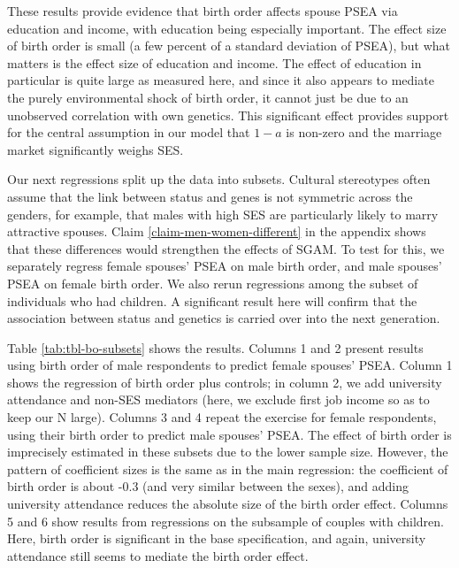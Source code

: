 \documentclass[
  12pt,
]{article}
\theoremstyle{definition}
\theoremstyle{definition}
\theoremstyle{definition}
\theoremstyle{definition}
\theoremstyle{remark}
\begin{document}
These results provide evidence that birth order affects spouse PSEA via
education and income, with education being especially important. The
effect size of birth order is small (a few percent of a standard
deviation of PSEA), but what matters is the effect size of education and
income. The effect of education in particular is quite large as measured
here, and since it also appears to mediate the purely environmental
shock of birth order, it cannot just be due to an unobserved correlation
with own genetics. This significant effect provides support for the
central assumption in our model that \(1 − a\) is non-zero and the
marriage market significantly weighs SES.

Our next regressions split up the data into subsets. Cultural
stereotypes often assume that the link between status and genes is not
symmetric across the genders, for example, that males with high SES are
particularly likely to marry attractive spouses. Claim
\ref{claim-men-women-different} in the appendix shows that these
differences would strengthen the effects of SGAM. To test for this, we
separately regress female spouses' PSEA on male birth order, and male
spouses' PSEA on female birth order. We also rerun regressions among the
subset of individuals who had children. A significant result here will
confirm that the association between status and genetics is carried over
into the next generation.

Table \ref{tab:tbl-bo-subsets} shows the results. Columns 1 and 2
present results using birth order of male respondents to predict female
spouses' PSEA. Column 1 shows the regression of birth order plus
controls; in column 2, we add university attendance and non-SES
mediators (here, we exclude first job income so as to keep our N large).
Columns 3 and 4 repeat the exercise for female respondents, using their
birth order to predict male spouses' PSEA. The effect of birth order is
imprecisely estimated in these subsets due to the lower sample size.
However, the pattern of coefficient sizes is the same as in the main
regression: the coefficient of birth order is about -0.3 (and very
similar between the sexes), and adding university attendance reduces the
absolute size of the birth order effect. Columns 5 and 6 show results
from regressions on the subsample of couples with children. Here, birth
order is significant in the base specification, and again, university
attendance still seems to mediate the birth order effect.

 
  \providecommand{\huxb}[2]{\arrayrulecolor[RGB]{#1}\global\arrayrulewidth=#2pt}
  \providecommand{\huxvb}[2]{\color[RGB]{#1}\vrule width #2pt}
  \providecommand{\huxtpad}[1]{\rule{0pt}{#1}}
  \providecommand{\huxbpad}[1]{\rule[-#1]{0pt}{#1}}
\end{document}

